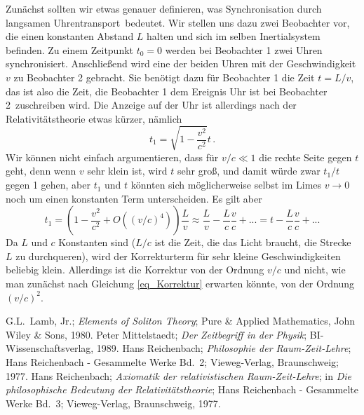 Zun\"achst sollten wir etwas genauer definieren,
was \glqq Synchronisation durch langsamen Uhrentransport\grqq\
bedeutet. Wir stellen uns dazu zwei Beobachter vor, die
einen konstanten Abstand $L$ halten und sich im
selben Inertialsystem befinden. Zu einem Zeitpunkt $t_0=0$ werden bei
Beobachter 1 zwei Uhren synchronisiert. Anschlie\ss end
wird eine der beiden Uhren mit der Geschwindigkeit $v$
zu Beobachter 2 gebracht. Sie ben\"otigt dazu f\"ur 
Beobachter 1 die Zeit $t=L/v$, das ist also die Zeit,
die Beobachter 1 dem Ereignis \glqq Uhr ist bei Beobachter 
2\grqq\ zuschreiben wird. Die Anzeige auf
der Uhr ist allerdings nach der Relativit\"atstheorie etwas k\"urzer, n\"amlich
\begin{equation}
\label{eq_Korrektur}
           t_1 = \sqrt{1-\frac{v^2}{c^2}} t \, .  
\end{equation}
Wir k\"onnen nicht einfach argumentieren, dass
f\"ur $v/c\ll 1$ die rechte Seite gegen $t$ geht,
denn wenn $v$ sehr klein ist, wird $t$ sehr gro\ss,
und damit  w\"urde zwar $t_1/t$ gegen 1 gehen,
aber $t_1$ und $t$ k\"onnten sich m\"oglicherweise
selbst im Limes $v\rightarrow 0$ noch um einen konstanten
Term unterscheiden. Es gilt aber
\begin{equation}
       t_1 = \left( 1 - \frac{v^2}{c^2} + O((v/c)^4) \right) \frac{L}{v}
       \approx \frac{L}{v} - \frac{L}{c}\frac{v}{c} + ... 
       = t -  \frac{L}{c}\frac{v}{c} + ...
\end{equation} 
Da $L$ und $c$ Konstanten sind ($L/c$ ist die Zeit, die das
Licht braucht, die Strecke $L$ zu durchqueren), wird
der Korrekturterm f\"ur sehr kleine Geschwindigkeiten
beliebig klein. Allerdings ist die Korrektur von der
Ordnung $v/c$ und nicht, wie man zun\"achst nach
Gleichung \ref{eq_Korrektur} erwarten k\"onnte,
von der Ordnung $(v/c)^2$. 
 
\begin{thebibliography}{99}
 G.L.\ Lamb, Jr.; {\it Elements of Soliton Theory}; 
         Pure \& Applied Mathematics, John Wiley \& Sons, 1980. 
\bibitem{Mittelstaedt} Peter Mittelstaedt; {\it Der Zeitbegriff in der
        Physik}; BI-Wissenschaftsverlag, 1989.        
 Hans Reichenbach; {\em Philosophie der 
       Raum-Zeit-Lehre}; Hans Reichenbach - Gesammelte Werke Bd.\ 2;
       Vieweg-Verlag, Braunschweig; 1977.
 Hans Reichenbach; {\em Axiomatik der
       relativistischen Raum-Zeit-Lehre}; in {\em Die philosophische
       Bedeutung der Relativit\"atstheorie}; Hans Reichenbach - Gesammelte
       Werke Bd.\ 3; Vieweg-Verlag, Braunschweig, 1977. 
\end{thebibliography}
  
%
